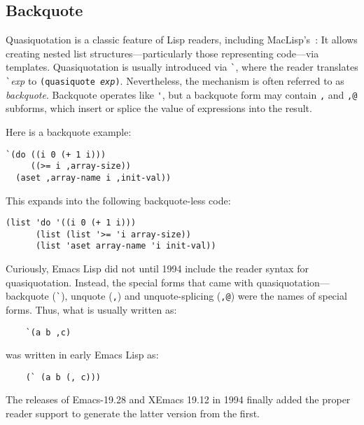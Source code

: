 \documentclass[format=acmsmall, review]{acmart}
\newcommand \Elisp {Emacs Lisp}
\begin{document}

\subsection{Backquote}
\label{sec:backquote}

Quasiquotation is a classic feature of Lisp readers, including
MacLisp's~\cite{Bawden1999}: It allows creating nested list
structures---particularly those representing code---via templates.
Quasiquotation is usually introduced via \verb|`|, where the reader
translates \verb|`|\textit{exp} to \texttt{(quasiquote \textit{exp})}.
Nevertheless, the mechanism is often referred to as
\textit{backquote}.  Backquote operates like \verb|'|, but a backquote
form may contain \texttt{,} and \texttt{,@} subforms, which insert or
splice the value of expressions into the result.

Here is a backquote example:
%
\begin{verbatim}
`(do ((i 0 (+ 1 i)))
     ((>= i ,array-size))
  (aset ,array-name i ,init-val))
\end{verbatim}
%
This expands into the following backquote-less code:
%
\begin{verbatim}
(list 'do '((i 0 (+ 1 i)))
      (list (list '>= 'i array-size))
      (list 'aset array-name 'i init-val))
\end{verbatim}
%
Curiously, \Elisp{} did not until 1994 include the reader syntax for
quasiquotation.
Instead, the special forms that came with quasiquotation---backquote
(\verb|`|), unquote (\verb|,|) and unquote-splicing (\verb|,@|) were
the names of special forms.   Thus, what is usually written as:
\begin{verbatim}
    `(a b ,c)
\end{verbatim}
was written in early \Elisp{} as:
\begin{verbatim}
    (` (a b (, c)))
\end{verbatim}
The releases of Emacs-19.28 and XEmacs 19.12 in 1994 finally added the
proper reader support to generate the latter version from the first.
\end{document}

